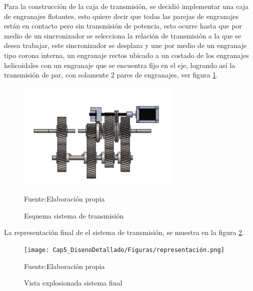 Para la construcción de la caja de transmisión, se decidió implementar una caja de engranajes flotantes, esto quiere decir que todas las parejas de engranajes están en contacto pero sin transmisión de potencia, esto ocurre hasta que por medio de un sincronizador se selecciona la relación de transmisión a la que se desea trabajar, este sincronizador se desplaza y une por medio de un engranaje tipo corona interna, un engranaje rectos ubicado a un costado de los engranajes helicoidales con un engranaje que se encuentra fijo en el eje, logrando así la transmisión de par, con solamente 2 pares de engranajes, ver figura \ref{fig:Caja_ejes}. 
\begin{figure}[ht!]
    \centering
    \includegraphics[width =0.7\textwidth]{Cap5_DisenoDetallado/Figuras/Caja_ejes.png}
    \caption{Esquema sistema de transmisión}{Fuente:Elaboración propia}
    \label{fig:Caja_ejes}
\end{figure}

La representación final de el sistema de transmisión, se muestra en la figura \ref{fig:representacion}. 

\begin{figure}[ht!]
    \centering
    \texttt{[image: Cap5\_DisenoDetallado/Figuras/representación.png]}
    \caption{Vista explosionada sistema final}{Fuente:Elaboración propia}
    \label{fig:representacion}
\end{figure}


